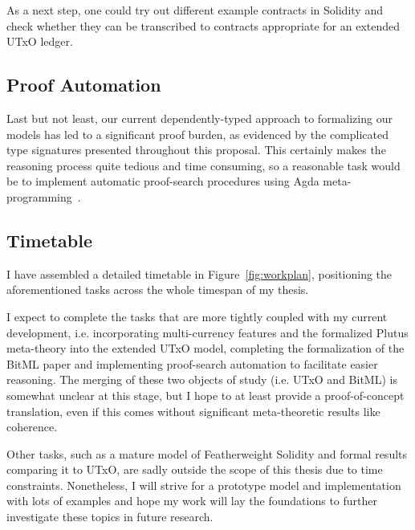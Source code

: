 \documentclass[acmsmall,nonacm=true,screen=true]{acmart}
\begin{document}
As a next step, one could try out different example contracts in Solidity and check whether they can be transcribed to
contracts appropriate for an extended UTxO ledger.

\subsection{Proof Automation}
Last but not least, our current dependently-typed approach to formalizing our models has led to a significant proof burden,
as evidenced by the complicated type signatures presented throughout this proposal.
This certainly makes the reasoning process quite tedious and time consuming, so a reasonable task would be
to implement automatic proof-search procedures using Agda meta-programming~\cite{agdaauto}.

\subsection{Timetable}
I have assembled a detailed timetable in Figure~\ref{fig:workplan},
positioning the aforementioned tasks across the whole timespan of my thesis.

I expect to complete the tasks that are more tightly coupled with my current development, i.e.
incorporating multi-currency features and the formalized Plutus meta-theory into the extended UTxO model,
completing the formalization of the BitML paper and implementing proof-search automation to facilitate easier reasoning.
The merging of these two objects of study (i.e. UTxO and BitML) is somewhat unclear at this stage, but I hope
to at least provide a proof-of-concept translation, even if this comes without significant meta-theoretic results like coherence.

Other tasks, such as a mature model of Featherweight Solidity and formal results comparing it to UTxO,
are sadly outside the scope of this thesis due to time constraints.
Nonetheless, I will strive for a prototype model and implementation with lots of examples
and hope my work will lay the foundations to further investigate these topics in future research.
\end{document}
